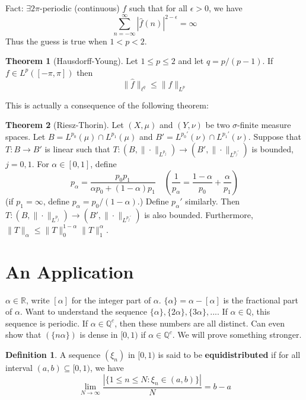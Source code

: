 \documentclass{article}
\theoremstyle{definition}
\newtheorem{thm}{Theorem}
\newtheorem{dfn}{Definition}
\newcommand{\QQ}{\mathbb Q}
\newcommand{\RR}{\mathbb R}
\begin{document}
\par Fact: $\exists 2 \pi$-periodic (continuous) $f$ such that for all $\epsilon > 0$, we have
\[
	\sum_{n = -\infty}^\infty |\widehat{f}(n)|^{2 - \epsilon} = \infty
\]
Thus the guess is true when $1 < p < 2$.

\begin{thm}[Hausdorff-Young]
	Let $1 \leq p \leq 2$ and let $q = p/(p - 1)$.
	If $f \in L^p([-\pi, \pi])$ then 
	\[
		\|\hat{f}\|_{\ell^q} \leq \|f\|_{L^p}
	\]
\end{thm}

This is actually a consequence of the following theorem:

\begin{thm}[Riesz-Thorin]
	Let $(X, \mu)$ and $(Y, \nu)$ be two $\sigma$-finite measure spaces.
	Let $B = L^{p_0}(\mu) \cap L^{p_1}(\mu)$ and $B' = L^{p_0'}(\nu) \cap L^{p_1'}(\nu)$.
	Suppose that $T: B \to B'$ is linear such that $T: (B, \|\cdot\|_{L^{p_j}}) \to (B', \|\cdot\|_{L^{p_j'}})$ is bounded, $j = 0, 1$.
	For $\alpha \in [0, 1]$, define
	\[
		p_{\alpha} = \frac{p_0 p_1}{\alpha p_0 + (1 - \alpha) p_1} \quad \left( \frac{1}{p_\alpha} = \frac{1 - \alpha}{p_0} + \frac{\alpha}{p_1} \right)
	\]
	(if $p_1 = \infty$, define $p_\alpha = p_0/(1 - \alpha)$.) 
	Define $p_\alpha'$ similarly.
	Then $T: (B, \|\cdot\|_{L^{p_j}}) \to (B', \|\cdot\|_{L^{p_j'}})$ is also bounded.
	Furthermore, $\|T\|_{\alpha} \leq \|T\|_0^{1 - \alpha} \|T\|_1^{\alpha}$.
\end{thm}

\section{An Application}

$\alpha \in \RR$, write $[\alpha]$ for the integer part of $\alpha$.
$\{\alpha\} = \alpha - [\alpha]$ is the fractional part of $\alpha$.
Want to understand the sequence $\{\alpha\}, \{2 \alpha\}, \{3 \alpha\}, ...$.
If $\alpha \in \QQ$, this sequence is periodic.
If $\alpha \in \QQ^c$, then these numbers are all distinct.
Can even show that $(\{n \alpha\})$ is dense in $[0, 1)$ if $\alpha \in \QQ^c$.
We will prove something stronger.

\begin{dfn}
	A sequence $(\xi_n)$ in $[0, 1)$ is said to be \textbf{equidistributed} if for all interval $(a, b) \subseteq [0, 1)$, we have
	\[
		\lim_{N \to \infty} \frac{|\{1 \leq n \leq N: \xi_n \in (a, b)\}|}{N} = b - a
	\]
\end{dfn}
\end{document}
